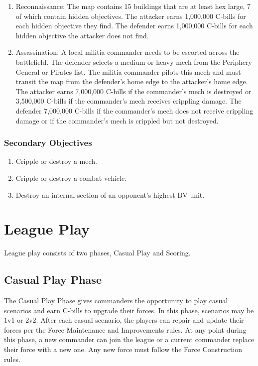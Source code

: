 \documentclass[UTF8]{article}
\begin{document}
\begin{enumerate}
\item Reconnaissance: The map contains 15 buildings that are at least hex large, 7 of which contain hidden objectives.
The attacker earns 1,000,000 C-bills for each hidden objective they find.
The defender earns 1,000,000 C-bills for each hidden objective the attacker does not find.

\item Assassination: A local militia commander needs to be escorted across the battlefield.
The defender selects a medium or heavy mech from the Periphery General or Pirates list.
The militia commander pilots this mech and must transit the map from the defender's home edge to the attacker's home edge.
The attacker earns 7,000,000 C-bills if the commander's mech is destroyed or 3,500,000 C-bills if the commander's mech receives crippling damage.
The defender 7,000,000 C-bills if the commander's mech does not receive crippling damage or if the commander's mech is crippled but not destroyed.

\end{enumerate}

\subsubsection{Secondary Objectives}

\begin{enumerate}

\item Cripple or destroy a mech.

\item Cripple or destroy a combat vehicle.

\item Destroy an internal section of an opponent's highest BV unit.

\end{enumerate}

\newpage

\section{League Play}

League play consists of two phases, Casual Play and Scoring.

\subsection{Casual Play Phase}

The Casual Play Phase gives commanders the opportunity to play casual scenarios and earn C-bills to upgrade their forces.
In this phase, scenarios may be 1v1 or 2v2.
After each casual scenario, the players can repair and update their forces per the Force Maintenance and Improvements rules.
At any point during this phase, a new commander can join the league or a current commander replace their force with a new one.
Any new force must follow the Force Construction rules.\\
\end{document}
